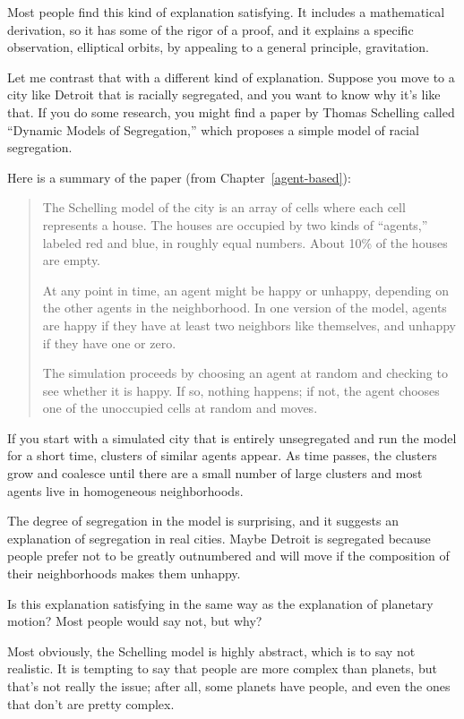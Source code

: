 \documentclass[10pt]{book}
\begin{document}
Most people find this kind of explanation satisfying.  It includes
a mathematical derivation, so it has some of the rigor of a proof,
and it explains a specific observation, elliptical orbits, by
appealing to a general principle, gravitation.

Let me contrast that with a different kind of explanation.  Suppose
you move to a city like Detroit that is racially segregated, and you
want to know why it's like that.  If you do some research, you might
find a paper by Thomas Schelling called ``Dynamic Models of
Segregation,'' which proposes a simple model of racial segregation.

Here is a summary of the paper (from Chapter~\ref{agent-based}):

\begin{quote}
The Schelling model of the city is an array of cells where each cell
represents a house.  The houses are occupied by two kinds of
``agents,'' labeled red and blue, in roughly equal numbers.  About
10\% of the houses are empty.  

At any point in time, an agent might be happy or unhappy, depending
on the other agents in the neighborhood.
In one version of the model, agents are happy if they have at least
two neighbors like themselves, and unhappy if they have one or zero.

The simulation proceeds by choosing an agent at random and checking
to see whether it is happy.  If so, nothing happens; if not,
the agent chooses one of the unoccupied cells at
random and moves.
\end{quote}

If you start with a simulated city that is entirely unsegregated and
run the model for a short time, clusters of similar agents appear.  As
time passes, the clusters grow and coalesce until there are a small
number of large clusters and most agents live in homogeneous
neighborhoods.

The degree of segregation in the model is surprising, and it suggests
an explanation of segregation in real cities.  Maybe Detroit
is segregated because people prefer not to be greatly outnumbered
and will move if the composition of their neighborhoods makes them
unhappy.
 

Is this explanation satisfying in the same way as the explanation of
planetary motion?  Most people would say not, but why?

Most obviously, the Schelling model is highly abstract, which is to
say not realistic.  It is tempting to say that people are more complex
than planets, but that's not really the issue; after all, some planets
have people, and even the ones that don't are pretty complex.
\end{document}
